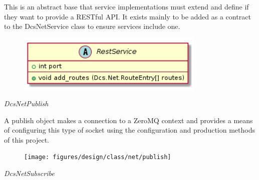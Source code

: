       \vspace*{-0.75cm}
      \begin{minipage}[t]{0.5\textwidth}
      	\vspace*{0.5cm}
        This is an abstract base that service implementations must extend and
        define if they want to provide a RESTful API. It exists mainly to be
        added as a contract to the DcsNetService class to ensure services
        include one.
      \end{minipage} \hfill
      \begin{minipage}[t]{0.45\textwidth}
        \begin{figure}[H]
          \includegraphics[width=0.8\textwidth]{figures/design/class/net/rest-service}
          \label{fig:dsg-classes-net-rest-service}
        \end{figure}
      \end{minipage}

      \emph{DcsNetPublish}

      \vspace*{-0.75cm}
      \begin{minipage}[t]{0.5\textwidth}
      	\vspace*{0.5cm}
        A publish object makes a connection to a ZeroMQ context and provides a
        means of configuring this type of socket using the configuration and
        production methods of this project.
      \end{minipage} \hfill
      \begin{minipage}[t]{0.45\textwidth}
        \begin{figure}[H]
          \texttt{[image: figures/design/class/net/publish]}
          \label{fig:dsg-classes-net-publish}
        \end{figure}
      \end{minipage}

      \emph{DcsNetSubscribe}

